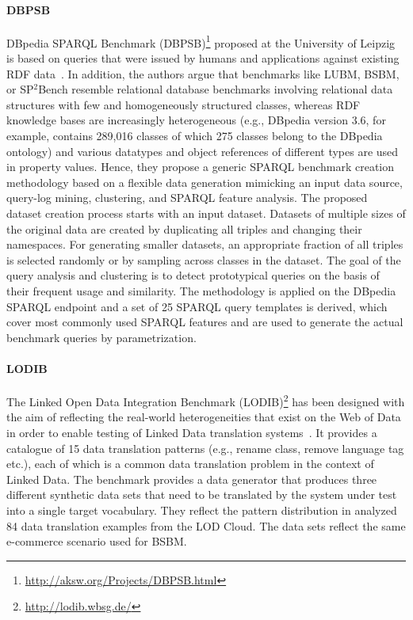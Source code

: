\paragraph{DBPSB} DBpedia SPARQL Benchmark (DBPSB)\footnote{\url{http://aksw.org/Projects/DBPSB.html}} proposed at the University of Leipzig is based on queries that were issued by humans and applications
against existing RDF data~\cite{Morsey2011,Morsey:2012:UBR:2900929.2901031}. In addition, the authors argue that benchmarks like LUBM, BSBM, or SP$^2$Bench resemble relational database benchmarks involving relational data structures with few and homogeneously structured classes, whereas RDF knowledge bases are increasingly heterogeneous (e.g., DBpedia version 3.6, for example, contains 289,016 classes of which 275 classes belong
to the DBpedia ontology) and various datatypes and object references of different types are
used in property values. Hence, they propose a generic SPARQL benchmark creation methodology based on a flexible data generation mimicking an input data source, query-log mining, clustering, and SPARQL feature analysis. The proposed dataset creation process starts with an input dataset. Datasets of multiple sizes of the original data are created by duplicating all triples and changing their namespaces.  For generating smaller datasets, an appropriate fraction of all triples is selected randomly or by sampling across classes in the dataset. The goal of the query analysis and clustering is to detect prototypical queries on the basis of their frequent usage and similarity. The methodology is applied on the DBpedia SPARQL endpoint and a set of 25 SPARQL query templates is derived, which cover most commonly used SPARQL features and are used to generate the actual benchmark queries by parametrization.

\paragraph{LODIB} The Linked Open Data Integration Benchmark (LODIB)\footnote{\url{http://lodib.wbsg.de/}} has been designed with the aim of reflecting the real-world heterogeneities that exist on the Web of Data in order to enable testing of Linked Data translation systems~\cite{DBLP:conf/www/RiveroSBR12}. It provides a catalogue of 15 data translation patterns (e.g., rename class, remove language tag etc.), each of which is a common data translation problem in the context of Linked Data. The benchmark provides a data generator that produces three different synthetic data sets that need to be translated
by the system under test into a single target vocabulary. They  reflect the pattern distribution in analyzed 84 data translation examples from the LOD Cloud. The data sets reflect the same e-commerce scenario used for BSBM.


